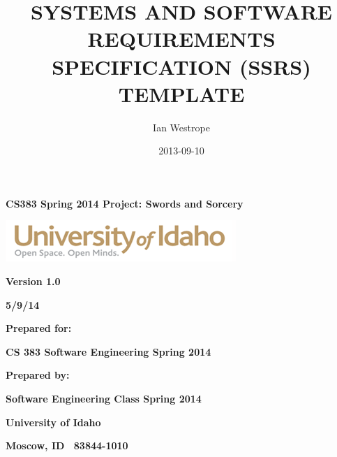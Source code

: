 \documentclass[twoside,letterpaper,pdftex]{article}
\title{SYSTEMS AND SOFTWARE REQUIREMENTS SPECIFICATION (SSRS) TEMPLATE}
\author{Ian Westrope}
\date{2013-09-10}
\begin{document}


\bigskip

{\centering\bfseries
CS383 Spring 2014 Project: Swords and Sorcery
\par}


\bigskip


\bigskip


\bigskip

{\centering\bfseries
{}
\par}

\begin{center}
\includegraphics[width=3.4362in,height=0.6134in]{uislogan.png}
\end{center}

\bigskip


\bigskip

{\centering\bfseries
Version 1.0
\par}

{\centering\bfseries
5/9/14
\par}


\bigskip


\bigskip

{\centering\bfseries
Prepared for:
\par}

{\centering\bfseries
CS 383	Software Engineering Spring 2014
\par}


\bigskip


\bigskip

{\centering\bfseries
Prepared by:
\par}

{\centering\bfseries
Software Engineering Class Spring 2014
\par}

{\centering\bfseries
University of Idaho
\par}

{\centering\bfseries
Moscow, ID \ 83844-1010
\par}


\end{document}
